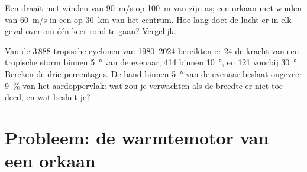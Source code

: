 \begin{exercise}[$\star\star\star$]\label{exo:g10:storms-and-cyclones:14}
Een  draait met winden van \qty{90}{m/s} op \qty{100}{m} van zijn as;
een orkaan met winden van \qty{60}{m/s} in een  op \qty{30}{km} van het
centrum. Hoe lang doet de lucht er in elk geval over om één keer rond te gaan?
Vergelijk.
\end{exercise}

\begin{exercise}[$\star\star\star$]\label{exo:g10:storms-and-cyclones:15}
Van de 3\,888 tropische cyclonen van 1980--2024 bereikten er 24 de kracht van
een tropische storm binnen \qty{5}{\degree} van de evenaar, 414 binnen
\qty{10}{\degree}, en 121 voorbij \qty{30}{\degree}. Bereken de drie
percentages. De band binnen \qty{5}{\degree} van de evenaar beslaat ongeveer
\qty{9}{\percent} van het aardoppervlak: wat zou je verwachten als de breedte er
niet toe deed, en wat besluit je?
\end{exercise}

\section{Probleem: de warmtemotor van een orkaan}


